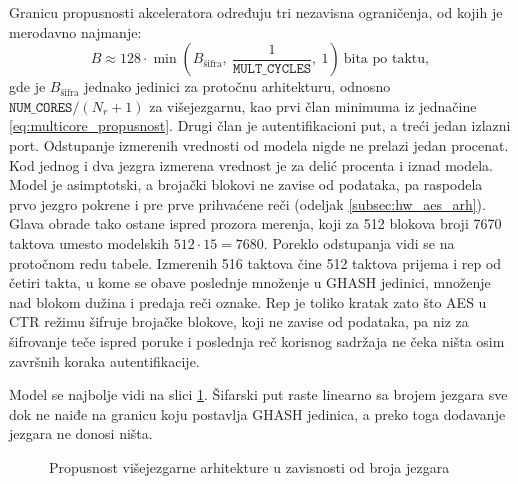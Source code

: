 Granicu propusnosti akceleratora određuju tri nezavisna ograničenja, od kojih je merodavno najmanje:
\begin{equation}
    \label{eq:aes_model}
    B \approx 128 \cdot \min\!\left(B_{\text{šifra}},\ \frac{1}{\texttt{MULT\_CYCLES}},\ 1\right) \ \text{bita po taktu},
\end{equation}
gde je $B_{\text{šifra}}$ jednako jedinici za protočnu arhitekturu, odnosno $\texttt{NUM\_CORES}/(N_r+1)$ za višejezgarnu, kao prvi član minimuma iz jednačine \eqref{eq:multicore_propusnost}. Drugi član je autentifikacioni put, a treći jedan izlazni port. Odstupanje izmerenih vrednosti od modela nigde ne prelazi jedan procenat. Kod jednog i dva jezgra izmerena vrednost je za delić procenta i iznad modela. Model je asimptotski, a brojački blokovi ne zavise od podataka, pa raspodela prvo jezgro pokrene i pre prve prihvaćene reči (odeljak \ref{subsec:hw_aes_arh}). Glava obrade tako ostane ispred prozora merenja, koji za 512 blokova broji 7670 taktova umesto modelskih $512 \cdot 15 = 7680$. Poreklo odstupanja vidi se na protočnom redu tabele. Izmerenih 516 taktova čine 512 taktova prijema i rep od četiri takta, u kome se obave poslednje množenje u GHASH jedinici, množenje nad blokom dužina i predaja reči oznake. Rep je toliko kratak zato što AES u CTR režimu šifruje brojačke blokove, koji ne zavise od podataka, pa niz za šifrovanje teče ispred poruke i poslednja reč korisnog sadržaja ne čeka ništa osim završnih koraka autentifikacije.

Model se najbolje vidi na slici \ref{fig:aes_propusnost}. Šifarski put raste linearno sa brojem jezgara sve dok ne naiđe na granicu koju postavlja GHASH jedinica, a preko toga dodavanje jezgara ne donosi ništa.

\begin{figure}[H]
\centering
{}
\caption{Propusnost višejezgarne arhitekture u zavisnosti od broja jezgara}
\label{fig:aes_propusnost}
\end{figure}

